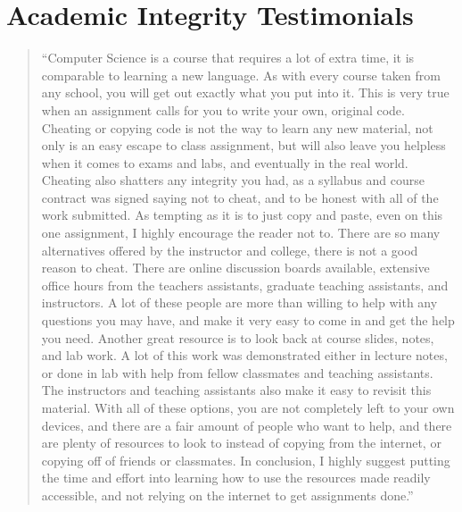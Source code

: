 \documentclass[12pt]{scrartcl}
\begin{document}
\newpage
\section*{Academic Integrity Testimonials}

\begin{quote}
``Computer Science is a course that requires a lot of extra time, it is comparable to learning a new language. As with every course taken from any school, you will get out exactly what you put into it. This is very true when an assignment calls for you to write your own, original code. Cheating or copying code is not the way to learn any new material, not only is an easy escape to class assignment, but will also leave you helpless when it comes to exams and labs, and eventually in the real world. Cheating also shatters any integrity you had, as a syllabus and course contract was signed saying not to cheat, and to be honest with all of the work submitted. As tempting as it is to just copy and paste, even on this one assignment, I highly encourage the reader not to. There are so many alternatives offered by the instructor and college, there is not a good reason to cheat. There are online discussion boards available, extensive office hours from the teachers assistants, graduate teaching assistants, and instructors. A lot of these people are more than willing to help with any questions you may have, and make it very easy to come in and get the help you need. Another great resource is to look back at course slides, notes, and lab work. A lot of this work was demonstrated either in lecture notes, or done in lab with help from fellow classmates and teaching assistants. The instructors and teaching assistants also make it easy to revisit this material.  With all of these options, you are not completely left to your own devices, and there are a fair amount of people who want to help, and there are plenty of resources to look to instead of copying from the internet, or copying off of friends or classmates. In conclusion, I highly suggest putting the time and effort into learning how to use the resources made readily accessible, and not relying on the internet to get assignments done.'' 
\end{quote}
\end{document}
